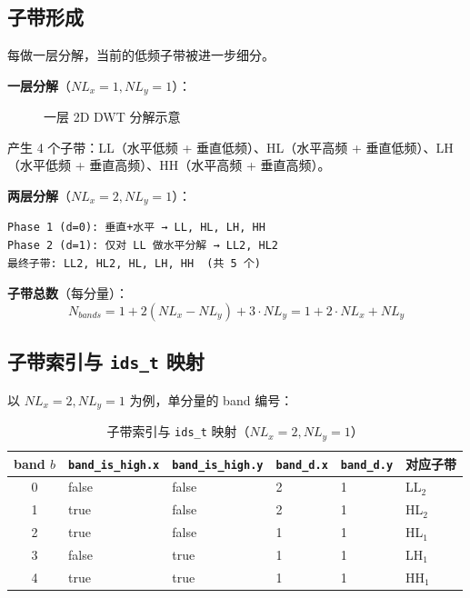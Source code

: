 \subsection{子带形成}

每做一层分解，当前的低频子带被进一步细分。

\textbf{一层分解}（$NL_x = 1, NL_y = 1$）：

\begin{figure}[H]
\centering
{}
\caption{一层 2D DWT 分解示意}
\label{fig:dwt-1level}
\end{figure}

产生 4 个子带：LL（水平低频 + 垂直低频）、HL（水平高频 + 垂直低频）、LH（水平低频 + 垂直高频）、HH（水平高频 + 垂直高频）。

\textbf{两层分解}（$NL_x = 2, NL_y = 1$）：
\begin{lstlisting}[numbers=none]
Phase 1 (d=0): 垂直+水平 → LL, HL, LH, HH
Phase 2 (d=1): 仅对 LL 做水平分解 → LL2, HL2
最终子带: LL2, HL2, HL, LH, HH  (共 5 个)
\end{lstlisting}

\textbf{子带总数}（每分量）：
\begin{equation}\label{eq:nbands}
N_{\mathit{bands}} = 1 + 2(NL_x - NL_y) + 3 \cdot NL_y = 1 + 2 \cdot NL_x + NL_y
\end{equation}

\subsection{子带索引与 \texttt{ids\_t} 映射}

以 $NL_x = 2, NL_y = 1$ 为例，单分量的 band 编号：

\begin{table}[H]
\centering
\caption{子带索引与 \texttt{ids\_t} 映射（$NL_x=2, NL_y=1$）}
\label{tab:dwt-band-index}
\begin{tabular}{@{}clllll@{}}
\toprule
band $b$ & \texttt{band\_is\_high.x} & \texttt{band\_is\_high.y} & \texttt{band\_d.x} & \texttt{band\_d.y} & 对应子带 \\
\midrule
0 & false & false & 2 & 1 & LL$_2$ \\
1 & true  & false & 2 & 1 & HL$_2$ \\
2 & true  & false & 1 & 1 & HL$_1$ \\
3 & false & true  & 1 & 1 & LH$_1$ \\
4 & true  & true  & 1 & 1 & HH$_1$ \\
\bottomrule
\end{tabular}
\end{table}

